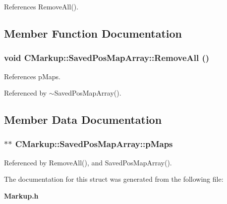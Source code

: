 References RemoveAll().

\subsection{Member Function Documentation}
\subsubsection[RemoveAll]{\setlength{\rightskip}{0pt plus 5cm}void CMarkup::SavedPosMapArray::RemoveAll ()\hspace{0.3cm}{\tt  [inline]}}\label{structCMarkup_1_1SavedPosMapArray_a6db2f1af7ecae5af27aab25e399b94c}




References pMaps.

Referenced by $\sim$SavedPosMapArray().

\subsection{Member Data Documentation}
\subsubsection[pMaps]{$\ast$$\ast$ {\bf CMarkup::SavedPosMapArray::pMaps}}\label{structCMarkup_1_1SavedPosMapArray_719491211d9de2fe06bfadc9a37daf46}




Referenced by RemoveAll(), and SavedPosMapArray().

The documentation for this struct was generated from the following file:\begin{CompactItemize}
\item 
{\bf Markup.h}\end{CompactItemize}
